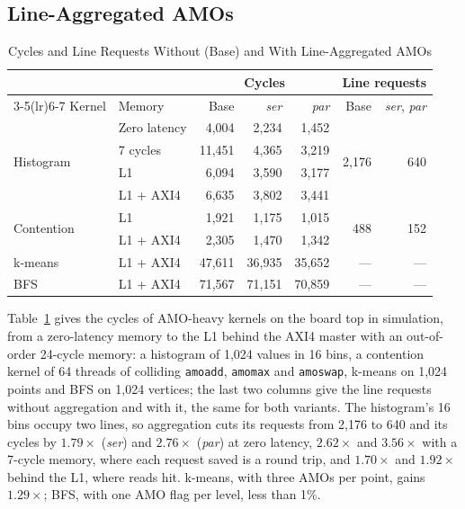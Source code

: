 \documentclass[journal]{IEEEtran}
\begin{document}
\subsection{Line-Aggregated AMOs}\label{sec:evalamo}\label{sec:method}
\begin{table}[t]
\caption{Cycles and Line Requests Without (Base) and With Line-Aggregated AMOs}
\label{tab:amo}
\centering\footnotesize
\setlength{\tabcolsep}{3.0pt}
\begin{tabular}{@{}llrrrrr@{}}
\toprule
 & & \multicolumn{3}{c}{Cycles} & \multicolumn{2}{c}{Line requests}\\
\cmidrule(lr){3-5}\cmidrule(lr){6-7}
Kernel & Memory & Base & \emph{ser} & \emph{par} & Base & \emph{ser}, \emph{par}\\
\midrule
\multirow{4}{*}{Histogram} & Zero latency & 4,004  & 2,234 & 1,452 & \multirow{4}{*}{2,176} & \multirow{4}{*}{640}\\
                           & 7 cycles     & 11,451 & 4,365 & 3,219 & & \\
                           & L1           & 6,094  & 3,590 & 3,177 & & \\
                           & L1 + AXI4    & 6,635  & 3,802 & 3,441 & & \\
\midrule
\multirow{2}{*}{Contention} & L1          & 1,921  & 1,175 & 1,015 & \multirow{2}{*}{488} & \multirow{2}{*}{152}\\
                           & L1 + AXI4    & 2,305  & 1,470 & 1,342 & & \\
\midrule
k-means                    & L1 + AXI4    & 47,611 & 36,935 & 35,652 & --- & ---\\
BFS                        & L1 + AXI4    & 71,567 & 71,151 & 70,859 & --- & ---\\
\bottomrule
\end{tabular}
\end{table}

Table~\ref{tab:amo} gives the cycles of AMO-heavy kernels on the board top in
simulation, from a zero-latency memory to the L1 behind the AXI4 master with an
out-of-order 24-cycle memory: a histogram of 1,024 values in 16 bins, a contention
kernel of 64 threads of colliding \texttt{amoadd}, \texttt{amomax} and
\texttt{amoswap}, k-means on 1,024 points and BFS on 1,024 vertices; the last two
columns give the line requests without aggregation and with it, the same for both
variants. The histogram's 16 bins occupy two lines, so aggregation cuts its requests
from 2,176 to 640 and its cycles by $1.79\times$ (\emph{ser}) and $2.76\times$
(\emph{par}) at zero latency, $2.62\times$ and $3.56\times$ with a 7-cycle memory, where
each request saved is a round trip, and $1.70\times$ and $1.92\times$ behind the L1,
where reads hit. k-means, with three AMOs per point, gains $1.29\times$; BFS, with one
AMO flag per level, less than 1\%.
\end{document}
